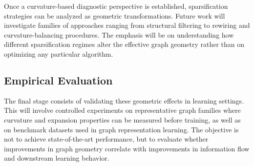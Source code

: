 \documentclass[letterpaper,12pt]{article}
\begin{document}
Once a curvature-based diagnostic perspective is established, sparsification strategies can be analyzed as geometric transformations. Future work will investigate families of approaches ranging from structural filtering to rewiring and curvature-balancing procedures. The emphasis will be on understanding how different sparsification regimes alter the effective graph geometry rather than on optimizing any particular algorithm.

\subsection{Empirical Evaluation}

The final stage consists of validating these geometric effects in learning settings. This will involve controlled experiments on representative graph families where curvature and expansion properties can be measured before training, as well as on benchmark datasets used in graph representation learning. The objective is not to achieve state-of-the-art performance, but to evaluate whether improvements in graph geometry correlate with improvements in information flow and downstream learning behavior.

\nocite{*}


\end{document}
